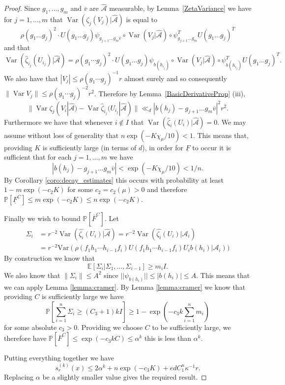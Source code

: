 \documentclass[10pt, english,oneside,reqno]{amsart}
\theoremstyle{plain}
\theoremstyle{remark}
\numberwithin{equation}{section}
\numberwithin{figure}{section}
\DeclareMathOperator{\var}{Var}
\newcommand{\Var}{\mathrm{Var}}
\begin{document}
\begin{proof}
    Since $g_1, \ldots , g_m$ and $\overline{v}$ are $\hat{\mathscr{A}}$ measurable, by Lemma~\ref{ZetaVariance} we have for $j=1, \dots, m$ that $\var (\zeta_j(V_j)|\hat{\mathscr{A}})$ is equal to $$ \rho(g_1 \dots g_j)^2\cdot U(g_1 \dots g_j)\psi_{g_{j + 1} \dots g_m \overline{v}} \circ \var (V_j |\hat{\mathscr{A}}) \circ \psi_{g_{j + 1} \dots g_m}^TU(g_1 \dots g_j)^T$$ and that $$\var (\hat{\zeta}_{i_j}(U_{i_j})|\hat{\mathscr{A}}) = \rho(g_1\cdots g_j)^2 \cdot U(g_1 \dots g_j)\psi_{b(h_{i_j})} \circ \var (V_j|\hat{\mathscr{A}}) \circ \psi_{b(h_{i_j})}^TU(g_1 \dots g_j)^T.$$ We also have that $| V_j | \leq \rho(g_1 \cdots g_j)^{-1} r$ almost surely and so consequently $\| \var V_j \| \leq \rho(g_1\cdots g_j)^{-2} r^2$. Therefore by Lemma~\ref{BasicDerivativeProp} (iii), $$\| \var \zeta_j(V_i| \hat{\mathscr{A}}) - \var \hat{\zeta}_{i_j}(U_{i_j}| \hat{\mathscr{A}}) \| \ll_d |b(h_j) - g_{j + 1} \dots g_m \overline{v}|^2 r^2.$$ Furthermore we have that whenever $i \notin I$ that $\var (\hat{\zeta}_{i}(U_{i})|\hat{\mathscr{A}}) = 0$. We may assume without loss of generality that $n \exp(-K \chi_{\mu} / 10) < 1$. This means that, providing $K$ is sufficiently large (in terms of $d$), in order for $\underline{F}$ to occur it is sufficient that for each $j = 1, \dots, m$ we have
    $$|b(h_j) - g_{j + 1} \dots g_m \overline{v}| < \exp(-K \chi_{\mu} / 10) < 1/n.$$
    By Corollary \ref{coro:decay_estimates} this occurs with probability at least $1 - m\exp(-c_2 K)$ for some $c_2 = c_2(\mu) > 0$ and therefore $\mathbb{P}[\underline{F}^C] \leq m\exp(-c_2 K) \leq n\exp(-c_2 K)$.

    Finally we wish to bound $\mathbb{P}[\overline{F}^C]$. Let 
    \begin{align*}
        \Sigma_i &= r^{-2} \var(\hat{\zeta_i}(U_i)|\hat{\mathscr{A}}) =  r^{-2}\var(\hat{\zeta_i}(U_i)|\mathscr{A}_i) \\
        &= r^{-2}\Var(\rho(f_1h_1\cdots h_{i-1}f_i)U(f_1h_1\cdots h_{i-1}f_i)U_ib(h_i)|\mathscr{A}_i))
    \end{align*}
    By construction we know that $$\mathbb{E}[\Sigma_i | \Sigma_1, \dots, \Sigma_{i-1}] \geq m_i I.$$
    We also know that $\| \Sigma_i \| \leq A^2$ since $||\psi_{b(h_i)}|| \leq |b(h_i)| \leq A$. This means that we can apply Lemma \ref{lemma:cramer}. By Lemma \ref{lemma:cramer} we know that providing $C$ is sufficiently large we have
    $$\mathbb{P}\left[ \sum_{i=1}^n \Sigma_i \geq (C_3+1) k I \right] \geq 1 - \exp\left(-c_3 k \sum_{i=1}^n m_i\right)$$
    for some absolute $c_3 > 0$. Providing we choose $C$ to be sufficiently large, we therefore have $\mathbb{P}[\overline{F}^C] \leq \exp(-c_3kC) \leq \alpha^k$  this is less than $\alpha^k$.

    Putting everything together we have $$s_r^{(k)}(x) \leq 2 \alpha^k + n\exp(-c_3K) + ed C_1^n \kappa^{-1} r.$$
    Replacing $\alpha$ be a slightly smaller value gives the required result.
\end{proof}
\end{document}
